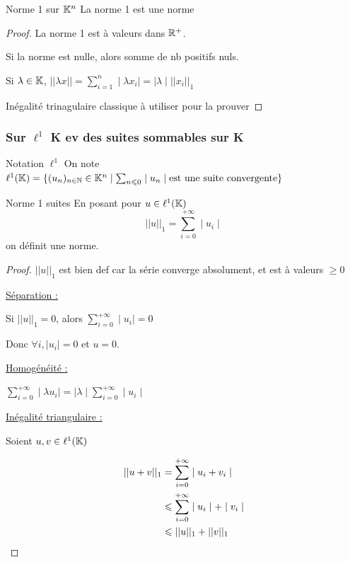 \begin{theoreme}{Norme 1 sur $\mathbb{K}^n$}{}
    La norme 1 est une norme 
\end{theoreme}

\begin{proof}
    La norme 1 est à valeurs dans $\mathbb{R}^+$. 

    Si la norme est nulle, alors somme de nb positifs nuls. 

    Si $\displaystyle \lambda \in \mathbb{K}$, $||\lambda x || = \sum_{i = 1 }^{n }\mid \lambda x_i \mid = \mid \lambda \mid ||x_i||_1$

    Inégalité trinagulaire classique à utiliser pour la prouver 
\end{proof}

\subsubsection{Sur \texorpdfstring{$\ell^1$}{l1} K ev des suites sommables sur K}

\begin{definition}{Notation $\ell^1$}{}
    On note $\ell^1(\mathbb{K}) = \{(u_n)_{n \in \mathbb{N}} \in \mathbb{K}^n \mid \sum_{n \leqslant 0} \mid u_n \mid \text{est une suite convergente}\}$
\end{definition}

\begin{theoreme}{Norme 1 suites}{}
    En posant pour $u \in \ell^1(\mathbb{K})$ 
    $$||u||_1 = \sum_{i = 0}^{+ \infty }\mid u_i \mid$$ 
    on définit une norme. 
\end{theoreme}

\begin{proof}
    $|| u ||_1$ est bien def car la série converge absolument, et est à valeurs $\geqslant 0$

    \quad \uline{Séparation : }

    Si $||u ||_1 = 0$, alors $\displaystyle \sum_{i = 0}^{+ \infty}  \mid u_i \mid = 0 $

    Donc $\forall i, \mid u_i\mid = 0 $ et $u = 0$. 

    \quad \uline{Homogénéité : }

    $\displaystyle \sum_{ i = 0 }^{+ \infty }\mid \lambda u_i \mid = \mid \lambda \mid \sum_{i = 0 }^{+ \infty }\mid u_i \mid$

    \quad \uline{Inégalité triangulaire : }

    Soient $u, v \in \ell^1(\mathbb{K})$ 

    \[ \displaystyle
    \begin{aligned}
        ||u + v ||_1 & =  \sum_{i = 0 }^{+ \infty }\mid u_i + v_i \mid \\
        \space & \leqslant  \sum_{i = 0}^{+ \infty} \mid u_i \mid + \mid v_i \mid \\
        \space & \leqslant  ||u||_1 + ||v||_1 \\
    \end{aligned}
    \]
\end{proof}

